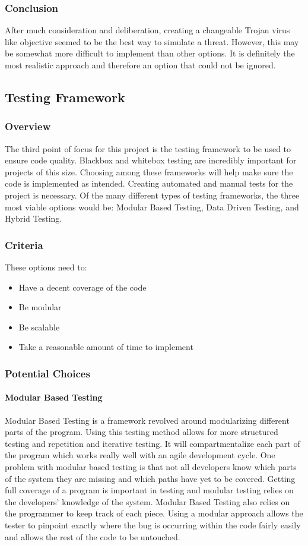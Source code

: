 \documentclass[draftclsnofoot, onecolumn, compsoc, 10pt]{IEEEtran}
\begin{document}
\subsubsection{Conclusion}
After much consideration and deliberation, creating a changeable Trojan virus like objective seemed to be the best way to simulate a threat. However, this may be somewhat more difficult to implement than other options. It is definitely the most realistic approach and therefore an option that could not be ignored.

\subsection{Testing Framework}
\subsubsection{Overview}
The third point of focus for this project is the testing framework to be used to ensure code quality. Blackbox and whitebox testing are incredibly important for projects of this size. Choosing among these frameworks will help make sure the code is implemented as intended. Creating automated and manual tests for the project is necessary. Of the many different types of testing frameworks, the three most viable options would be: Modular Based Testing, Data Driven Testing, and Hybrid Testing. 
\subsubsection{Criteria}
These options need to:
\begin{itemize}
	\item Have a decent coverage of the code
    \item Be modular
    \item Be scalable
    \item Take a reasonable amount of time to implement
\end{itemize}

\subsubsection{Potential Choices}
\paragraph{Modular Based Testing}
Modular Based Testing is a framework revolved around modularizing different parts of the program. Using this testing method allows for more structured testing and repetition and iterative testing. It will compartmentalize each part of the program which works really well with an agile development cycle. One problem with modular based testing is that not all developers know which parts of the system they are missing and which paths have yet to be covered. Getting full coverage of a program is important in testing and modular testing relies on the developers' knowledge of the system. Modular Based Testing also relies on the programmer to keep track of each piece. Using a modular approach allows the tester to pinpoint exactly where the bug is occurring within the code fairly easily and allows the rest of the code to be untouched.
\end{document}
